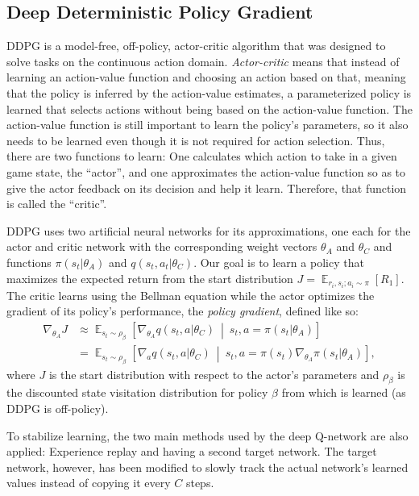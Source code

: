 \documentclass[a4paper,titlepage]{article}
\DeclareMathOperator{\Expectation}{\mathbb{E}}
\newcommand{\Exp}[3]{\Expectation_{#1} \left[ #2 \ \middle| \ #3 \right]}
\newcommand{\Ex}[2]{\Expectation_{#1} \left[ #2 \right]}
\begin{document}
\subsection{Deep Deterministic Policy Gradient}

DDPG is a model-free, off-policy, actor-critic algorithm that was designed to solve tasks on the continuous action domain. \emph{Actor-critic} means that instead of learning an action-value function and choosing an action based on that, meaning that the policy is inferred by the action-value estimates, a parameterized policy is learned that selects actions without being based on the action-value function. The action-value function is still important to learn the policy's parameters, so it also needs to be learned even though it is not required for action selection. Thus, there are two functions to learn: One calculates which action to take in a given game state, the ``actor'', and one approximates the action-value function so as to give the actor feedback on its decision and help it learn. Therefore, that function is called the ``critic''.

DDPG uses two artificial neural networks for its approximations, one each for the actor and critic network with the corresponding weight vectors $\theta_A$ and $\theta_C$ and functions $\pi(s_t | \theta_A)$ and $q(s_t, a_t | \theta_C)$. Our goal is to learn a policy that maximizes the expected return from the start distribution $J = \Ex{r_i, s_i; a_i \sim \pi}{R_1}$. The critic learns using the Bellman equation while the actor optimizes the gradient of its policy's performance, the \emph{policy gradient}, defined like so:
\begin{align*}
  \nabla_{\theta_A} J &\approx \Exp{s_t \sim \rho_\beta}{\nabla_{\theta_A} q(s_t, a | \theta_C)}{s_t, a = \pi(s_t | \theta_A)} \\
  &= \Exp{s_t \sim \rho_\beta}{\nabla_a q(s_t, a | \theta_C)}{s_t, a = \pi(s_t) \nabla_{\theta_A} \pi(s_t | \theta_A)},
\end{align*}
where $J$ is the start distribution with respect to the actor's parameters and $\rho_\beta$ is the discounted state visitation distribution for policy $\beta$ from which is learned (as DDPG is off-policy).

To stabilize learning, the two main methods used by the deep Q-network are also applied: Experience replay and having a second target network. The target network, however, has been modified to slowly track the actual network's learned values instead of copying it every $C$ steps.
\end{document}
